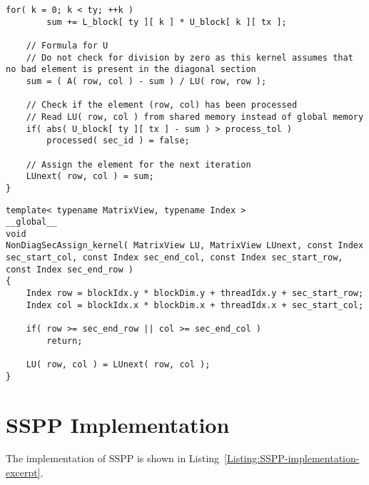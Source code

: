\begin{lstlisting}[caption={Implementation of the \code{RSecCompute\_kernel()} kernel which computes one iteration of a right section.},label={Listing:ICMxPP-implementation->kernels->right-section-compute}]
	for( k = 0; k < ty; ++k )
		sum += L_block[ ty ][ k ] * U_block[ k ][ tx ];
	
	// Formula for U
	// Do not check for division by zero as this kernel assumes that no bad element is present in the diagonal section
	sum = ( A( row, col ) - sum ) / LU( row, row );
	
	// Check if the element (row, col) has been processed
	// Read LU( row, col ) from shared memory instead of global memory
	if( abs( U_block[ ty ][ tx ] - sum ) > process_tol )
		processed( sec_id ) = false;
	
	// Assign the element for the next iteration
	LUnext( row, col ) = sum;
}
\end{lstlisting}

\begin{lstlisting}[caption={Implementation of the \code{NonDiagSecAssign\_kernel()} kernel that assigns values of the next iteration to the matrix representing the current iteration.},label={Listing:ICMxPP-implementation->kernels->nondiagonal-assign}]
template< typename MatrixView, typename Index >
__global__
void
NonDiagSecAssign_kernel( MatrixView LU, MatrixView LUnext, const Index sec_start_col, const Index sec_end_col, const Index sec_start_row, const Index sec_end_row )
{
	Index row = blockIdx.y * blockDim.y + threadIdx.y + sec_start_row;
	Index col = blockIdx.x * blockDim.x + threadIdx.x + sec_start_col;
	
	if( row >= sec_end_row || col >= sec_end_col )
		return;
	
	LU( row, col ) = LUnext( row, col );
}
\end{lstlisting}





\chapter{SSPP Implementation}\label{Appendix:SSPP-implementation}
The implementation of SSPP is shown in Listing~\ref{Listing:SSPP-implementation-excerpt}.

